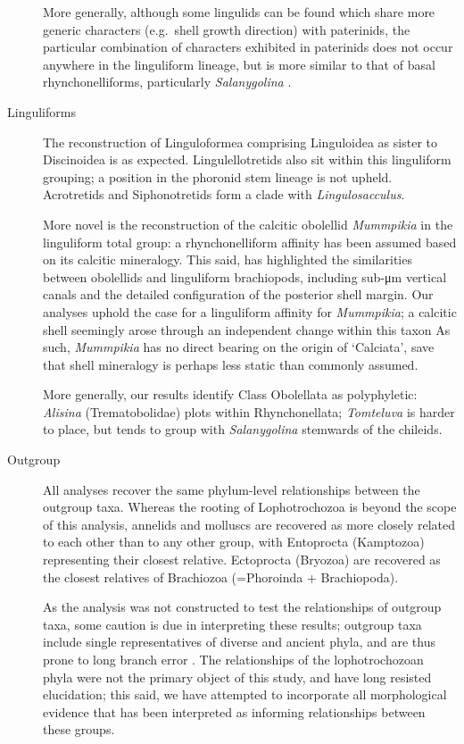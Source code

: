 \documentclass[openany]{book}
\begin{document}
\begin{description}
More generally, although some lingulids can be found which share more
generic characters (e.g.~shell growth direction) with paterinids, the
particular combination of characters exhibited in paterinids does not
occur anywhere in the linguliform lineage, but is more similar to that
of basal rhynchonelliforms, particularly \emph{Salanygolina} \citep[as
noted by][]{Holmer2009Theenigmatic}.
\item[Linguliforms]
The reconstruction of Linguloformea comprising Linguloidea as sister to
Discinoidea is as expected. Lingulellotretids also sit within this
linguliform grouping; a position in the phoronid stem lineage
\citep[advocated by][]{Balthasar2009EarlyCambrian} is not upheld.
Acrotretids and Siphonotretids form a clade with \emph{Lingulosacculus}.

More novel is the reconstruction of the calcitic obolellid
\emph{Mummpikia} in the linguliform total group: a rhynchonelliform
affinity has been assumed based on its calcitic mineralogy. This said,
\citet{Balthasar2008iMummpikia} has highlighted the similarities between
obolellids and linguliform brachiopods, including sub-μm vertical canals
and the detailed configuration of the posterior shell margin. Our
analyses uphold the case for a linguliform affinity for
\emph{Mummpikia}; a calcitic shell seemingly arose through an
independent change within this taxon As such, \emph{Mummpikia} has no
direct bearing on the origin of `Calciata', save that shell mineralogy
is perhaps less static than commonly assumed.

More generally, our results identify Class Obolellata as polyphyletic:
\emph{Alisina} (Trematobolidae) plots within Rhynchonellata;
\emph{Tomteluva} is harder to place, but tends to group with
\emph{Salanygolina} stemwards of the chileids.
\item[Outgroup]
All analyses recover the same phylum-level relationships between the
outgroup taxa. Whereas the rooting of Lophotrochozoa is beyond the scope
of this analysis, annelids and molluscs are recovered as more closely
related to each other than to any other group, with Entoprocta
(Kamptozoa) representing their closest relative. Ectoprocta (Bryozoa)
are recovered as the closest relatives of Brachiozoa (=Phoroinda +
Brachiopoda).

As the analysis was not constructed to test the relationships of
outgroup taxa, some caution is due in interpreting these results;
outgroup taxa include single representatives of diverse and ancient
phyla, and are thus prone to long branch error \citep{Parks2014}. The
relationships of the lophotrochozoan phyla were not the primary object
of this study, and have long resisted elucidation; this said, we have
attempted to incorporate all morphological evidence that has been
interpreted as informing relationships between these groups.


\end{description}
\end{document}
